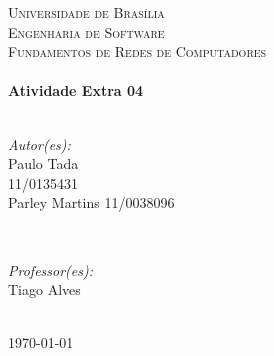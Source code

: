 \begin{titlepage}

\center %
 

\textsc{\LARGE Universidade de Brasília}\\[1.5cm]	%
\textsc{\Large Engenharia de Software}\\[0.5cm]		%
\textsc{\large Fundamentos de Redes de Computadores}\\[0.5cm]		%


\HRule \\[0.4cm]
{ \huge \bfseries Atividade Extra 04}\\[0.4cm] %
\HRule \\[1.5cm]
 

\begin{minipage}{0.4\textwidth}
\begin{flushleft} \large
\emph{Autor(es):}\\
Paulo Tada\\ 11/0135431 \\%
Parley Martins 11/0038096
\end{flushleft}
\end{minipage}
~
\begin{minipage}{0.4\textwidth}
\begin{flushright} \large
\emph{Professor(es):} \\
Tiago Alves %
\end{flushright}
\end{minipage}\\[4cm]


{\large \today}\\[3cm] %



\vfill %

\end{titlepage}
